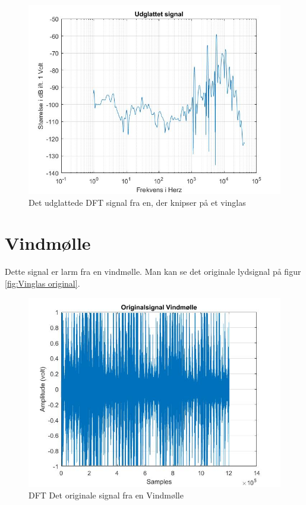 \begin{figure}[H]
	\centering
	\includegraphics[width=140mm]{figures/Vinglas/udglattet.jpg}
	\caption{Det udglattede DFT signal fra en, der knipser på et vinglas}
	\label{fig:Vinglas udglattet}
\end{figure}



\section{Vindmølle}
Dette signal er larm fra en vindmølle. Man kan se det originale lydsignal på figur \ref{fig:Vinglas original}.
\begin{figure}[H]
	\centering
	\includegraphics[width=140mm]{figures/Vind/original.jpg}
	\caption{DFT Det originale signal fra en Vindmølle}
	\label{fig:Vind original}
\end{figure}

